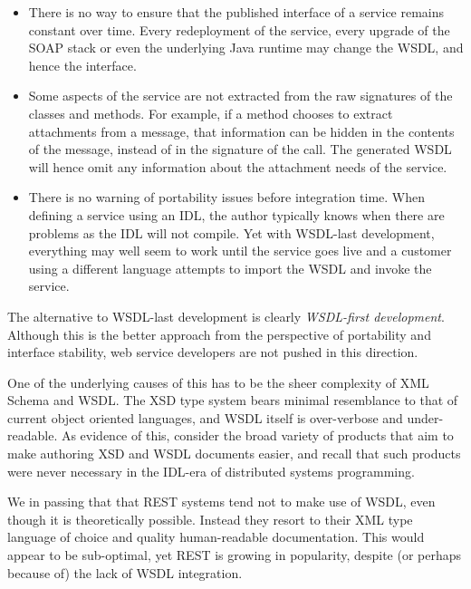 \begin{itemize}

\item
    
There is no way to ensure that the published interface of a service
remains constant over time. Every redeployment of the service, every
upgrade of the SOAP stack or even the underlying Java runtime may
change the WSDL, and hence the interface.

\item

Some aspects of the service are not extracted from the raw signatures
of the classes and methods. For example, if a method chooses to
extract attachments from a message, that information can be hidden in
the contents of the message, instead of in the signature of the
call. The generated WSDL will hence omit any information about the
attachment needs of the service.

\item

There is no warning of portability issues before integration time.
When defining a service using an IDL, the author typically knows when
there are problems as the IDL will not compile. Yet with WSDL-last
development, everything may well seem to work until the service goes
live and a customer using a different language attempts to import the
WSDL and invoke the service.
    
\end{itemize}

The alternative to WSDL-last development is clearly \emph{WSDL-first
development}. Although this is the better approach from the perspective
of portability and interface stability, web service developers are not
pushed in this direction.

One of the underlying causes of this has to be the sheer complexity of
XML Schema and WSDL. The XSD type system bears minimal resemblance to
that of current object oriented languages, and WSDL itself is
over-verbose and under-readable. As evidence of this, consider the
broad variety of products that aim to make authoring XSD and WSDL
documents easier, and recall that such products were never necessary
in the IDL-era of distributed systems programming.

We in passing that that REST systems \cite{fielding:rest} tend not to
make use of WSDL, even though it is theoretically possible. Instead
they resort to their XML type language of choice and quality
human-readable documentation. This would appear to be sub-optimal, yet
REST is growing in popularity, despite (or perhaps because of) the
lack of WSDL integration.


